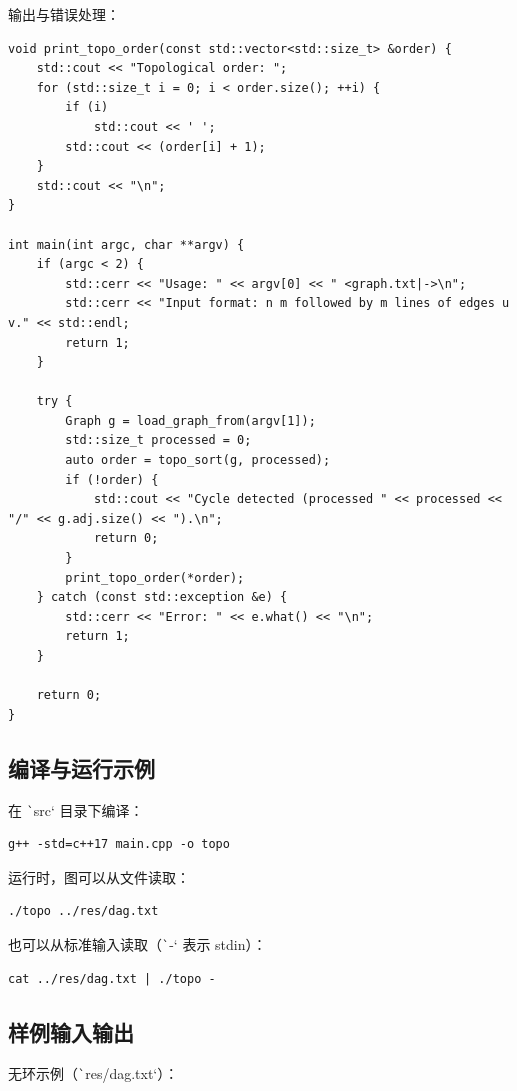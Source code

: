 \documentclass[12pt, a4paper]{ctexart}
\begin{document}
输出与错误处理：

\begin{verbatim}
void print_topo_order(const std::vector<std::size_t> &order) {
    std::cout << "Topological order: ";
    for (std::size_t i = 0; i < order.size(); ++i) {
        if (i)
            std::cout << ' ';
        std::cout << (order[i] + 1);
    }
    std::cout << "\n";
}

int main(int argc, char **argv) {
    if (argc < 2) {
        std::cerr << "Usage: " << argv[0] << " <graph.txt|->\n";
        std::cerr << "Input format: n m followed by m lines of edges u v." << std::endl;
        return 1;
    }

    try {
        Graph g = load_graph_from(argv[1]);
        std::size_t processed = 0;
        auto order = topo_sort(g, processed);
        if (!order) {
            std::cout << "Cycle detected (processed " << processed << "/" << g.adj.size() << ").\n";
            return 0;
        }
        print_topo_order(*order);
    } catch (const std::exception &e) {
        std::cerr << "Error: " << e.what() << "\n";
        return 1;
    }

    return 0;
}
\end{verbatim}

\subsection{编译与运行示例}

在 \texttt`src` 目录下编译：

\begin{verbatim}
g++ -std=c++17 main.cpp -o topo
\end{verbatim}

运行时，图可以从文件读取：

\begin{verbatim}
./topo ../res/dag.txt
\end{verbatim}

也可以从标准输入读取（\texttt`-` 表示 stdin）：

\begin{verbatim}
cat ../res/dag.txt | ./topo -
\end{verbatim}

\subsection{样例输入输出}

无环示例（\texttt`res/dag.txt`）：
\end{document}
